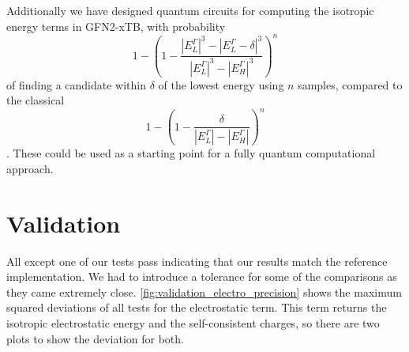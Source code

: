 Additionally we have designed quantum circuits for computing the isotropic energy terms in GFN2-xTB, with probability 
\begin{equation}
1-\left(1-\frac{|{E^\Gamma_L}|^3-|{E^\Gamma_L-\delta}|^3}{|{E^\Gamma_L}|^3-|{E^\Gamma_H}|^3}\right)^n
\end{equation}
of finding a candidate within $\delta$ of the lowest energy using $n$ samples, compared to the classical
\begin{equation}
    1-\left(1-\frac{\delta}{|{E^\Gamma_L}|-|{E^\Gamma_H}|}\right)^n
\end{equation}. 
These could be used as a starting point for a fully quantum computational approach. 

\section{Validation}

All except one of our tests pass indicating that our results match the reference implementation. We had to introduce a tolerance for some of the comparisons as they came extremely close. \autoref{fig:validation_electro_precision} shows the maximum squared deviations of all tests for the electrostatic term. This term returns the isotropic electrostatic energy and the self-consistent charges, so there are two plots to show the deviation for both.

